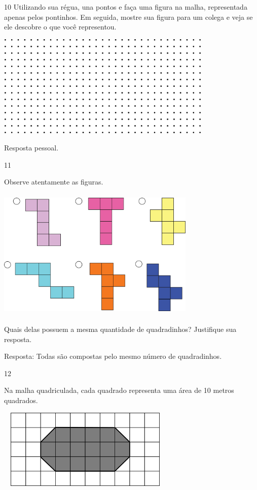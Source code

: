 \begin{escolha}
\num{10} Utilizando sua régua, una pontos e faça uma figura na malha, representada apenas pelos pontinhos. Em seguida, mostre sua
figura para um colega e veja se ele descobre o que você representou.


\includegraphics[width=4.05869in,height=1.93350in]{media/image58.png}

Resposta pessoal.

\num{11}

Observe atentamente as figuras.


\includegraphics[width=3.72532in,height=2.47521in]{media/image59.png}

Quais delas possuem a mesma quantidade de quadradinhos? Justifique sua resposta.


Resposta:
Todas são compostas pelo mesmo número de quadradinhos.

\num{12}

Na malha quadriculada, cada quadrado representa uma área de 10 metros quadrados.


\includegraphics[width=3.33333in,height=1.50517in]{media/image60.png}


\end{escolha}
